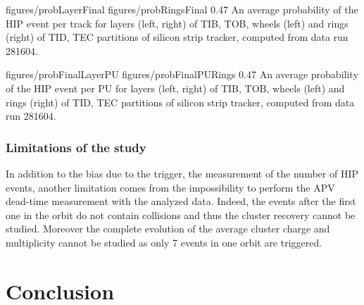                  {figures/probLayerFinal} %
                 {figures/probRingsFinal} %
                 {0.47}       %
                 {An average probability of the HIP event per track for layers (left, right) of TIB, TOB, wheels (left) and rings (right) of TID, TEC partitions of silicon strip tracker, computed from data run 281604.} 


                 {figures/probFinalLayerPU} %
                 {figures/probFinalPURings} %
                 {0.47}       %
                 {An average probability of the HIP event per PU for layers (left, right) of TIB, TOB, wheels (left) and rings (right) of TID, TEC partitions of silicon strip tracker, computed from data run 281604.} 

\subsubsection{Limitations of the study}
 
In addition to the bias due to the trigger, the measurement of the number of HIP events, another limitation comes from the impossibility to perform the APV dead-time measurement with the analyzed data. Indeed, the events after the first one in the orbit do not contain collisions and thus the cluster recovery cannot be studied. Moreover the complete evolution of the average cluster charge and multiplicity cannot be studied as only 7 events in one orbit are triggered. 

\section{Conclusion}

